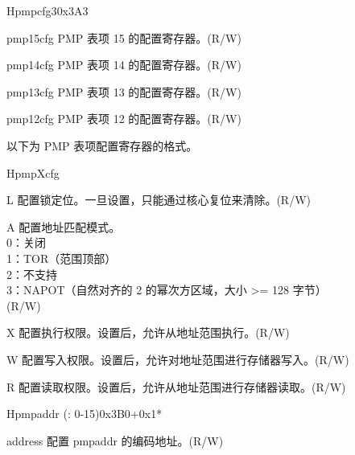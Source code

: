 \begin{register}{H}{pmpcfg3}{0x3A3}
\label{regdesc:lppmpcfg3}%
%
%
%
%
\regnewline%
\begin{regdesc}
\begin{reglist}
\label{fielddesc:lppmp15cfg}\item [pmp15cfg] PMP 表项 15 的配置寄存器。(R/W)
\label{fielddesc:lppmp14cfg}\item [pmp14cfg] PMP 表项 14 的配置寄存器。(R/W)
\label{fielddesc:lppmp13cfg}\item [pmp13cfg] PMP 表项 13 的配置寄存器。(R/W)
\label{fielddesc:lppmp12cfg}\item [pmp12cfg] PMP 表项 12 的配置寄存器。(R/W)
\end{reglist}
\end{regdesc}
\end{register}

以下为 PMP 表项配置寄存器的格式。

\begin{register}{H}{pmpXcfg}{}
\label{regdesc:lppmpXcfg}%
%
%
%
%
%
%
\regnewline%
\begin{regdesc}
\begin{reglist}
\label{fielddesc:LPPMPXCFGL}\item [L] 配置锁定位。一旦设置，只能通过核心复位来清除。(R/W)
\label{fielddesc:LPPMPXCFGA}\item [A] 配置地址匹配模式。 \\
0：关闭 \\
1：TOR（范围顶部）\\
2：不支持 \\
3：NAPOT（自然对齐的 2 的幂次方区域，大小 >= 128 字节）\\
(R/W)
\label{fielddesc:LPPMPXCFGX}\item [X] 配置执行权限。设置后，允许从地址范围执行。(R/W)
\label{fielddesc:LPPMPXCFGW}\item [W] 配置写入权限。设置后，允许对地址范围进行存储器写入。(R/W)
\label{fielddesc:LPPMPXCFGR}\item [R] 配置读取权限。设置后，允许从地址范围进行存储器读取。(R/W)
\end{reglist}
\end{regdesc}
\end{register}

\begin{register}{H}{pmpaddr (: 0-15)}{0x3B0+0x1*}\label{regdesc:lppmpaddrN}
%
\regnewline%
\begin{regdesc}\begin{reglist}
\label{fielddesc:LPPMPADDR}\item [address] 配置 pmpaddr 的编码地址。(R/W)
\end{reglist}\end{regdesc}
\end{register}
